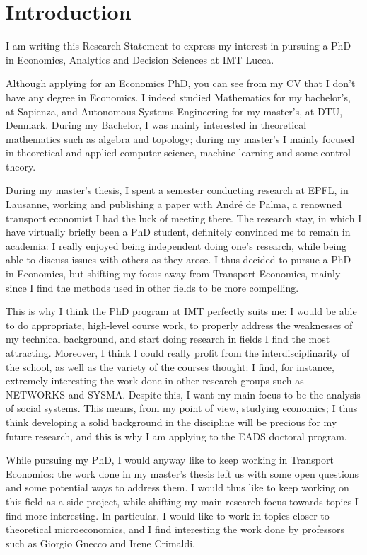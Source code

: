 \documentclass{article}
\begin{document}
\section{Introduction}
\label{sec:intro}

I am writing this Research Statement to express my interest in pursuing a PhD in Economics, Analytics and Decision Sciences at IMT Lucca.

Although applying for an Economics PhD, you can see from my CV that I don’t have any degree in Economics.
I indeed studied Mathematics for my bachelor's, at Sapienza, and Autonomous Systems Engineering for my master’s, at DTU, Denmark.
During my Bachelor, I was mainly interested in theoretical mathematics such as algebra and topology;
during my master's I mainly focused in theoretical and applied computer science, machine learning and some control theory.

During my master's thesis, I spent a semester conducting research at EPFL, in Lausanne,
working and publishing a paper with André de Palma,
a renowned transport economist I had the luck of meeting there.
The research stay, in which I have virtually briefly been a PhD student,
definitely convinced me to remain in academia:
I really enjoyed being independent doing one’s research,
while being able to discuss issues with others as they arose.
I thus decided to pursue a PhD in Economics, but shifting my focus away from Transport Economics,
mainly since I find the methods used in other fields to be more compelling.

This is why I think the PhD program at IMT perfectly suits me:
I would be able to do appropriate, high-level course work,
to properly address the weaknesses of my technical background,
and start doing research in fields I find the most attracting.
Moreover, I think I could really profit from the interdisciplinarity of the school,
as well as the variety of the courses thought:
I find, for instance, extremely interesting the work done in other research groups such as NETWORKS and SYSMA.
Despite this, I want my main focus to be the analysis of social systems.
This means, from my point of view, studying economics;
I thus think developing a solid background in the discipline will be precious for my future research,
and this is why I am applying to the EADS doctoral program.

While pursuing my PhD, I would anyway like to keep working in Transport Economics:
the work done in my master's thesis \parencite{yang2026recovering}
left us with some open questions \parencite[for some context, see][]{https://doi.org/10.1111/iere.12692}
and some potential ways to address them.
I would thus like to keep
working on this field as a side project,
while shifting my main research focus towards topics I find more interesting.
In particular, I would like to work in topics closer to theoretical microeconomics,
and I find interesting the work done by professors such as Giorgio Gnecco and Irene Crimaldi.
\end{document}
